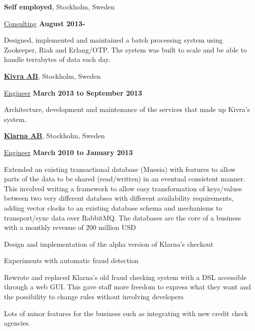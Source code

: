 \documentclass[10pt]{article}
\renewcommand\textit[1]{\underline{#1}}
\newcommand{\halfblankline}{\quad\vspace{-0.5\baselineskip}\pagebreak[3]}
\begin{document}
\halfblankline

\textbf{Self employed},
Stockholm, Sweden
\begin{outerlist}
\item[] \textit{Consulting}
  \hfill \textbf{August 2013-}
  \begin{innerlist}
    \item
      Designed, implemented and maintained a batch processing system using
      Zookeeper, Riak and Erlang/OTP. The system was built to scale and be
      able to handle terrabytes of data each day.
  \end{innerlist}
\end{outerlist}

\halfblankline

\href{http://www.kivra.se/}{\textbf{Kivra AB}},
Stockholm, Sweden
\begin{outerlist}
\item[] \textit{Engineer}
  \hfill \textbf{March 2013 to September 2013}
  \begin{innerlist}
    \item
      Architecture, development and maintenance of the services that made up
      Kivra's system.
  \end{innerlist}
\end{outerlist}

\halfblankline

\href{http://www.klarna.com/}{\textbf{Klarna AB}},
Stockholm, Sweden
\begin{outerlist}
\item[] \textit{Engineer}%
  \hfill \textbf{March 2010 to January 2013}
  \begin{innerlist}
  \item
    Extended an existing transactional database (Mnesia)
    with features to allow parts of the data to be shared (read/written)
    in an eventual consistent manner.
    This involved writing a framework to allow easy transformation
    of keys/values between two very different databses with different
    availability requirements, adding vector clocks to an existing database
    schema and mechanisms to transport/sync data over RabbitMQ.
    The databases are the core of a business with a monthly revenue of
    200 million USD
  \item
    Design and implementation of the alpha version of Klarna's checkout
  \item
    Experiments with automatic fraud detection
  \item
    Rewrote and replaced Klarna's old fraud checking system with a DSL
    accessible through a web GUI.
    This gave staff more freedom to express what they want and the
    possibility to change rules without involving developers
  \item
    Lots of minor features for the business such as integrating with new
    credit check agencies.
  \end{innerlist}
\end{outerlist}
\end{document}
